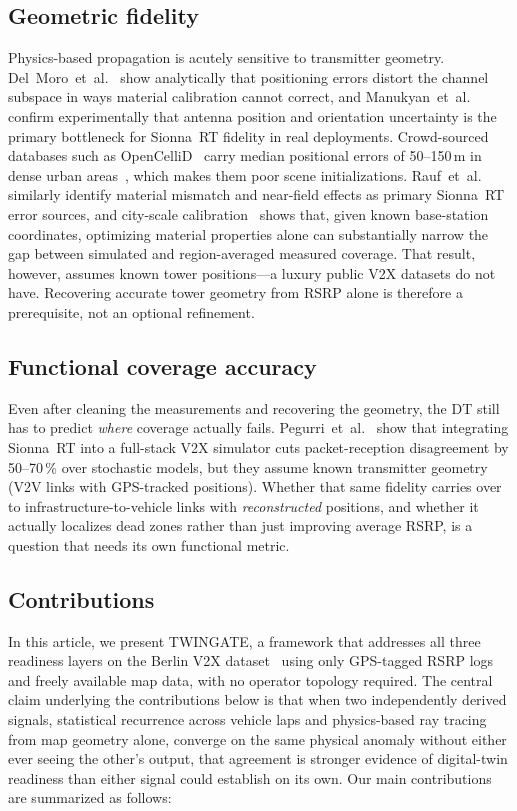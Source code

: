 \documentclass[conference]{IEEEtran}
\begin{document}
\subsection*{Geometric fidelity}
Physics-based propagation is acutely sensitive to transmitter geometry.
Del~Moro~et~al.~\cite{delmoro2025dt} show analytically that positioning
errors distort the channel subspace in ways material calibration
cannot correct, and Manukyan~et~al.~\cite{manukyan2025sionna} confirm
experimentally that antenna position and orientation uncertainty is the
primary bottleneck for Sionna~RT fidelity in real deployments.
Crowd-sourced databases such as OpenCelliD~\cite{opencellid2024} carry
median positional errors of 50--150\,m in dense urban
areas~\cite{del2017survey}, which makes them poor scene
initializations. Rauf~et~al.~\cite{rauf2026kpi} similarly identify
material mismatch and near-field effects as primary Sionna~RT error
sources, and city-scale calibration~\cite{beyraghi2025ris} shows that,
given known base-station coordinates, optimizing material properties
alone can substantially narrow the gap between simulated and
region-averaged measured coverage. That result, however, assumes known
tower positions---a luxury public V2X datasets do not have. Recovering
accurate tower geometry from RSRP alone is therefore a prerequisite,
not an optional refinement.

\subsection*{Functional coverage accuracy}
Even after cleaning the measurements and recovering the geometry, the
DT still has to predict \emph{where} coverage actually fails.
Pegurri~et~al.~\cite{pegurri2025van3twin} show that integrating
Sionna~RT into a full-stack V2X simulator cuts packet-reception
disagreement by 50--70\,\% over stochastic models, but they assume
known transmitter geometry (V2V links with GPS-tracked positions).
Whether that same fidelity carries over to infrastructure-to-vehicle
links with \emph{reconstructed} positions, and whether it actually
localizes dead zones rather than just improving average RSRP, is a
question that needs its own functional metric.

\subsection*{Contributions}
In this article, we present TWINGATE, a framework that addresses all
three readiness layers on the Berlin V2X dataset~\cite{schiegg2022berlin}
using only GPS-tagged RSRP logs and freely available map data, with no
operator topology required.
The central claim underlying the contributions below is that when two
independently derived signals, statistical recurrence across vehicle
laps and physics-based ray tracing from map geometry alone, converge on
the same physical anomaly without either ever seeing the other's
output, that agreement is stronger evidence of digital-twin readiness
than either signal could establish on its own.
Our main contributions are summarized as follows:
\end{document}
